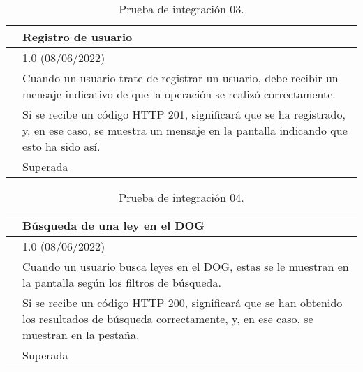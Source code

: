 \begin{table}[H]
\begin{center}
\begin{tabular}{|p{3cm}|p{10cm}|} \hline
\centering {\bf PI-03} & Registro de usuario  \\ \hline\hline
\centering {\bf Versión} & 1.0 (08/06/2022) \\ \hline
\centering {\bf Descripción} & Cuando un usuario trate de registrar un usuario, debe recibir un mensaje indicativo de que la operación se realizó correctamente. \\ \hline
\centering {\bf Criterio de aceptación} & Si se recibe un código HTTP 201, significará que se ha registrado, y, en ese caso, se muestra un mensaje en la pantalla indicando que esto ha sido así. \\ \hline
\centering {\bf Estado} & Superada \\ \hline
\end{tabular}
\caption{Prueba de integración 03.}
\label{enlacePI3}
\end{center}
\end{table}

\begin{table}[H]
\begin{center}
\begin{tabular}{|p{3cm}|p{10cm}|} \hline
\centering {\bf PI-04} & Búsqueda de una ley en el DOG  \\ \hline\hline
\centering {\bf Versión} & 1.0 (08/06/2022) \\ \hline
\centering {\bf Descripción} & Cuando un usuario busca leyes en el DOG, estas se le muestran en la pantalla según los filtros de búsqueda. \\ \hline
\centering {\bf Criterio de aceptación} & Si se recibe un código HTTP 200, significará que se han obtenido los resultados de búsqueda correctamente, y, en ese caso, se muestran en la pestaña. \\ \hline
\centering {\bf Estado} & Superada \\ \hline
\end{tabular}
\caption{Prueba de integración 04.}
\label{enlacePI4}
\end{center}
\end{table}

